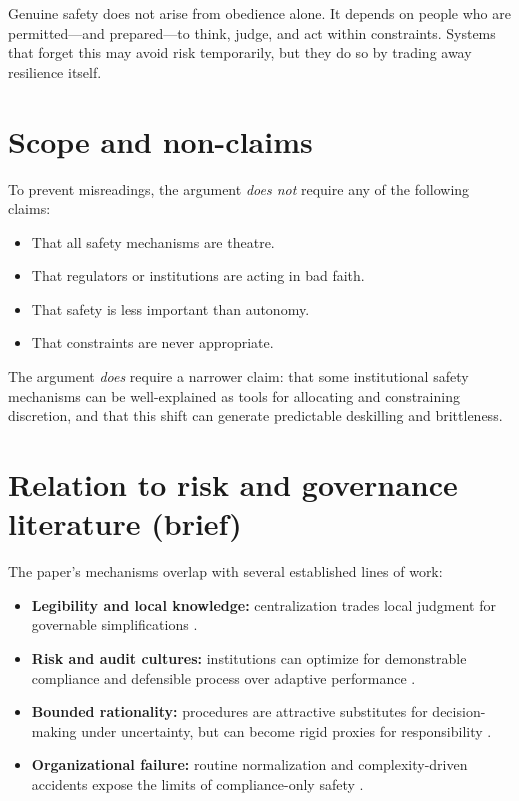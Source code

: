 \documentclass[11pt]{article}
\begin{document}
Genuine safety does not arise from obedience alone. It depends on people who are
permitted---and prepared---to think, judge, and act within constraints. Systems that
forget this may avoid risk temporarily, but they do so by trading away resilience
itself.

\appendix
\section{Scope and non-claims}

To prevent misreadings, the argument \emph{does not} require any of the following
claims:

\begin{itemize}
  \item That all safety mechanisms are theatre.
  \item That regulators or institutions are acting in bad faith.
  \item That safety is less important than autonomy.
  \item That constraints are never appropriate.
\end{itemize}

The argument \emph{does} require a narrower claim: that some institutional safety
mechanisms can be well-explained as tools for allocating and constraining discretion,
and that this shift can generate predictable deskilling and brittleness.

\section{Relation to risk and governance literature (brief)}

The paper’s mechanisms overlap with several established lines of work:

\begin{itemize}
  \item \textbf{Legibility and local knowledge:} centralization trades local judgment
    for governable simplifications \citep{Scott1998Seeing}.
  \item \textbf{Risk and audit cultures:} institutions can optimize for demonstrable
    compliance and defensible process over adaptive performance \citep{Power2004Risk}.
  \item \textbf{Bounded rationality:} procedures are attractive substitutes for
    decision-making under uncertainty, but can become rigid proxies for responsibility
    \citep{Simon1955Behavioral}.
  \item \textbf{Organizational failure:} routine normalization and complexity-driven
    accidents expose the limits of compliance-only safety
    \citep{Vaughan1996Challenger,Perrow1984Normal}.
\end{itemize}



\end{document}
